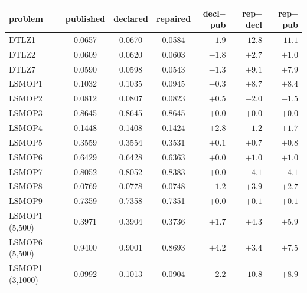\scriptsize
\setlength{\tabcolsep}{4pt}
\begin{tabular}{lcccrrr}
\toprule
problem & published & declared & repaired & decl$-$pub & rep$-$decl & rep$-$pub \\
\midrule
DTLZ1 & 0.0657 & 0.0670 & 0.0584 & $-1.9$ & $+12.8$ & $+11.1$ \\
DTLZ2 & 0.0609 & 0.0620 & 0.0603 & $-1.8$ & $+2.7$ & $+1.0$ \\
DTLZ7 & 0.0590 & 0.0598 & 0.0543 & $-1.3$ & $+9.1$ & $+7.9$ \\
LSMOP1 & 0.1032 & 0.1035 & 0.0945 & $-0.3$ & $+8.7$ & $+8.4$ \\
LSMOP2 & 0.0812 & 0.0807 & 0.0823 & $+0.5$ & $-2.0$ & $-1.5$ \\
LSMOP3 & 0.8645 & 0.8645 & 0.8645 & $+0.0$ & $+0.0$ & $+0.0$ \\
LSMOP4 & 0.1448 & 0.1408 & 0.1424 & $+2.8$ & $-1.2$ & $+1.7$ \\
LSMOP5 & 0.3559 & 0.3554 & 0.3531 & $+0.1$ & $+0.7$ & $+0.8$ \\
LSMOP6 & 0.6429 & 0.6428 & 0.6363 & $+0.0$ & $+1.0$ & $+1.0$ \\
LSMOP7 & 0.8052 & 0.8052 & 0.8383 & $+0.0$ & $-4.1$ & $-4.1$ \\
LSMOP8 & 0.0769 & 0.0778 & 0.0748 & $-1.2$ & $+3.9$ & $+2.7$ \\
LSMOP9 & 0.7359 & 0.7358 & 0.7351 & $+0.0$ & $+0.1$ & $+0.1$ \\
LSMOP1 (5,500) & 0.3971 & 0.3904 & 0.3736 & $+1.7$ & $+4.3$ & $+5.9$ \\
LSMOP6 (5,500) & 0.9400 & 0.9001 & 0.8693 & $+4.2$ & $+3.4$ & $+7.5$ \\
LSMOP1 (3,1000) & 0.0992 & 0.1013 & 0.0904 & $-2.2$ & $+10.8$ & $+8.9$ \\
\bottomrule
\end{tabular}
